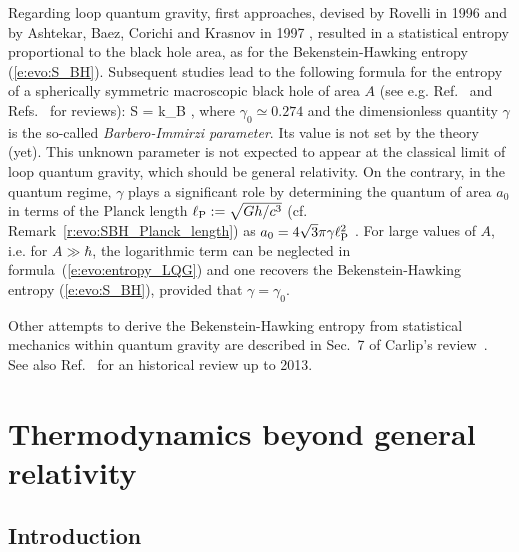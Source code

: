 Regarding loop quantum gravity, first approaches, devised by Rovelli in 1996 \cite{Rovel96}
and by Ashtekar, Baez, Corichi and Krasnov in 1997 \cite{AshteBCK98},
resulted in a statistical entropy proportional to the black hole area,
as for the Bekenstein-Hawking entropy (\ref{e:evo:S_BH}). Subsequent studies
lead to the following
formula for the entropy of a spherically symmetric macroscopic black hole of area $A$
(see e.g. Ref.~\cite{EngleNP10} and Refs.~\cite{BarbeP23,Carli14,Perez17} for reviews):
\be \label{e:evo:entropy_LQG}
    S = k_{\rm B}  ,
\ee
where $\gamma_0 \simeq 0.274$ and the dimensionless quantity $\gamma$ is the so-called
\emph{Barbero-Immirzi parameter}.
Its value is not set by the theory (yet). This unknown parameter
is not expected to appear at the classical limit of
loop quantum gravity, which should be general relativity.
On the contrary, in the quantum regime, $\gamma$ plays a significant role
by determining the quantum of area $a_0$ in terms of
the Planck length $\ell_{\rm P} := \sqrt{Gh/c^3}$ (cf. Remark~\ref{r:evo:SBH_Planck_length}) as
$a_0 = 4\sqrt{3}\pi \gamma \ell_{\rm P}^2$ \cite{Rovel04}.
For large values of $A$, i.e.  for $A\gg \hbar$,
the logarithmic term can be neglected in formula~(\ref{e:evo:entropy_LQG}) and one recovers the
Bekenstein-Hawking entropy (\ref{e:evo:S_BH}), provided that $\gamma = \gamma_0$.

Other attempts to derive the Bekenstein-Hawking entropy from statistical mechanics
within quantum gravity are described in Sec.~7 of Carlip's review~\cite{Carli14}.
See also Ref.~\cite{GrumiMS15} for an historical review up to 2013.


\section{Thermodynamics beyond general relativity} \label{s:evo:Wald_entropy}

\subsection{Introduction}

